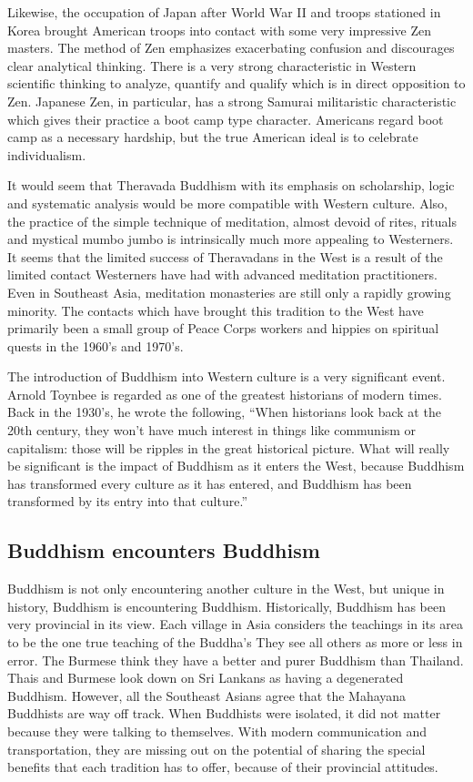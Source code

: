 \documentclass[a5paper,10pt,english]{book}
\begin{document}
\sphinxAtStartPar
Likewise, the occupation of Japan after World War II and troops
stationed in Korea brought American troops into contact with some very
impressive Zen masters. The method of Zen emphasizes exacerbating
confusion and discourages clear analytical thinking. There is a very
strong characteristic in Western scientific thinking to analyze,
quantify and qualify which is in direct opposition to Zen. Japanese Zen,
in particular, has a strong Samurai militaristic characteristic which
gives their practice a boot camp type character. Americans regard boot
camp as a necessary hardship, but the true American ideal is to
celebrate individualism.

\sphinxAtStartPar
It would seem that Theravada Buddhism with its emphasis on scholarship,
logic and systematic analysis would be more compatible with Western
culture. Also, the practice of the simple technique of 
meditation, almost devoid of rites, rituals and mystical mumbo jumbo
is intrinsically much more appealing to Westerners. It seems that the
limited success of Theravadans in the West is a result of the limited
contact Westerners have had with advanced meditation practitioners. Even
in Southeast Asia,  meditation monasteries are still only a
rapidly growing minority. The contacts which have brought this tradition
to the West have primarily been a small group of Peace Corps workers and
hippies on spiritual quests in the 1960’s and 1970’s.

\sphinxAtStartPar
The introduction of Buddhism into Western culture is a very significant
event. Arnold Toynbee is regarded as one of the greatest historians of
modern times. Back in the 1930’s, he wrote the following, “When
historians look back at the 20th century, they won’t have much interest
in things like communism or capitalism: those will be ripples in the
great historical picture. What will really be significant is the impact
of Buddhism as it enters the West, because Buddhism has transformed
every culture as it has entered, and Buddhism has been transformed by
its entry into that culture.”


\subsection{Buddhism encounters Buddhism}
\label{\detokenize{saints:buddhism-encounters-buddhism}}
\sphinxAtStartPar
Buddhism is not only encountering another culture in the West, but
unique in history, Buddhism is encountering Buddhism. Historically,
Buddhism has been very provincial in its view. Each village in Asia
considers the teachings in its area to be the one true teaching of the
Buddha’s  They see all others as more or less in error. The
Burmese think they have a better and purer Buddhism than Thailand. Thais
and Burmese look down on Sri Lankans as having a degenerated Buddhism.
However, all the Southeast Asians agree that the Mahayana Buddhists are
way off track. When Buddhists were isolated, it did not matter because
they were talking to themselves. With modern communication and
transportation, they are missing out on the potential of sharing the
special benefits that each tradition has to offer, because of their
provincial attitudes.
\end{document}
